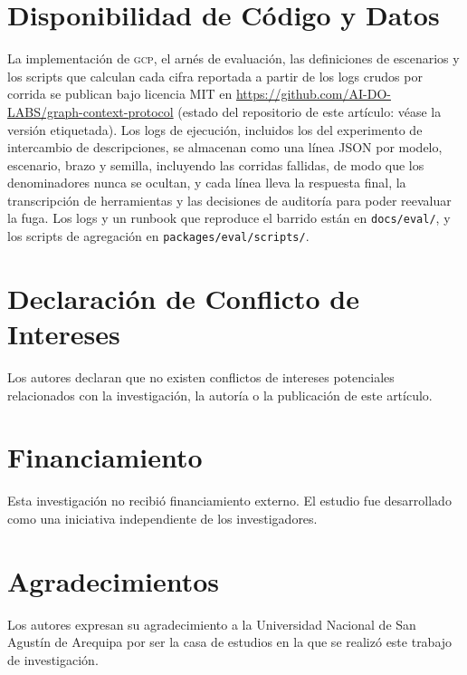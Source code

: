 \documentclass[conference,letterpaper]{IEEEtran}
\newcommand{\gcp}{\textsc{gcp}}
\begin{document}
\section*{Disponibilidad de Código y Datos}
\label{sec:availability}
La implementación de \gcp{}, el arnés de evaluación, las definiciones de escenarios y los scripts que calculan cada cifra reportada a partir de los logs crudos por corrida se publican bajo licencia MIT en
\url{https://github.com/AI-DO-LABS/graph-context-protocol} (estado del repositorio de este artículo:
véase la versión etiquetada). Los logs de ejecución, incluidos los del experimento de intercambio de
descripciones, se almacenan como una línea JSON por modelo, escenario, brazo y semilla, incluyendo las
corridas fallidas, de modo que los denominadores nunca se ocultan, y cada línea lleva la respuesta
final, la transcripción de herramientas y las decisiones de auditoría para poder reevaluar la fuga. Los logs y un runbook que reproduce el barrido están en \texttt{docs/eval/}, y los scripts de agregación en \texttt{packages/eval/scripts/}.

\section*{Declaraci\'on de Conflicto de Intereses}
Los autores declaran que no existen conflictos de intereses potenciales relacionados con la
investigaci\'on, la autor\'ia o la publicaci\'on de este art\'iculo.

\section*{Financiamiento}
Esta investigaci\'on no recibi\'o financiamiento externo. El estudio fue desarrollado como una
iniciativa independiente de los investigadores.

\section*{Agradecimientos}
Los autores expresan su agradecimiento a la Universidad Nacional de San Agust\'in de Arequipa por ser
la casa de estudios en la que se realiz\'o este trabajo de investigaci\'on.
\end{document}
